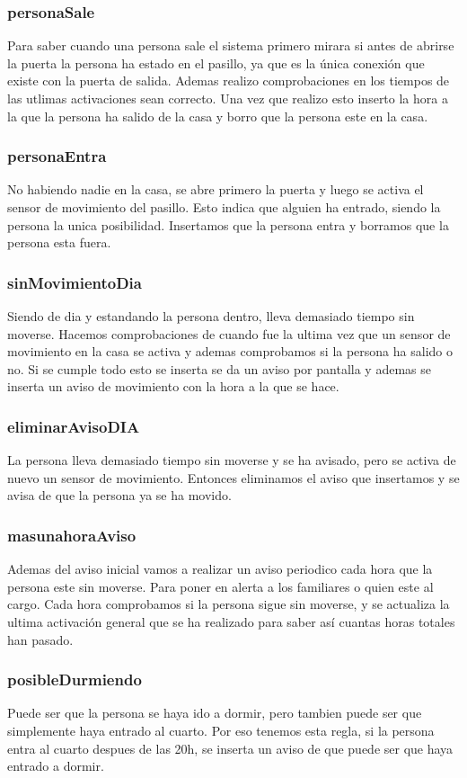 \documentclass[12pt,a4paper]{article}
\begin{document}
\subsubsection{personaSale}
Para saber cuando una persona sale el sistema primero mirara si antes de abrirse la puerta la persona ha estado en el pasillo, ya que es la única conexión que existe con la puerta de salida. Ademas realizo comprobaciones en los tiempos de las utlimas activaciones sean correcto. Una vez que realizo esto inserto la hora a la que la persona ha salido de la casa y borro que la persona este en la casa.
\subsubsection{personaEntra}
No habiendo nadie en la casa, se abre primero la puerta y luego se activa el sensor de movimiento del pasillo. Esto indica que alguien ha entrado, siendo la persona la unica posibilidad. Insertamos que la persona entra y borramos que la persona esta fuera.
\subsubsection{sinMovimientoDia}
Siendo de dia y estandando la persona dentro, lleva demasiado tiempo sin moverse. Hacemos comprobaciones de cuando fue la ultima vez que un sensor de movimiento en la casa se activa y ademas comprobamos si la persona ha salido o no. Si se cumple todo esto se inserta se da un aviso por pantalla y ademas se inserta un aviso de movimiento con la hora a la que se hace.
\subsubsection{eliminarAvisoDIA}
La persona lleva demasiado tiempo sin moverse y se ha avisado, pero se activa de nuevo un sensor de movimiento. Entonces eliminamos el aviso que insertamos y se avisa de que la persona ya se ha movido. 
\subsubsection{masunahoraAviso}
Ademas del aviso inicial vamos a realizar un aviso periodico cada hora que la persona este sin moverse. Para poner en alerta a los familiares o quien este al cargo. Cada hora comprobamos si la persona sigue sin moverse, y se actualiza la ultima activación general que se ha realizado para saber así cuantas horas totales han pasado. 
\subsubsection{posibleDurmiendo}
Puede ser que la persona se haya ido a dormir, pero tambien puede ser que simplemente haya entrado al cuarto. Por eso tenemos esta regla, si la persona entra al cuarto despues de las 20h, se inserta un aviso de que puede ser que haya entrado a dormir.
\end{document}
